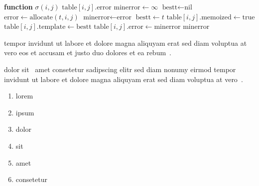 \begin{algorithm}[htb]
\begin{center}
    \begin{algorithmic}[1]
        \STATE \textbf{function} $\sigma\left(i,j\right)$
        \STATE {}
            \RETURN $\text{table}\left[i,j\right].\text{error}$
        \ENDIF
        \STATE $\text{minerror}\leftarrow\infty$
        \STATE $\text{bestt}\leftarrow{}\text{nil}$
            \STATE $\text{error}\leftarrow{}\text{allocate}\left(t,i,j\right)$
                \STATE $\text{minerror}\leftarrow{}\text{error}$
                \STATE $\text{bestt}\leftarrow{}t$
            \ENDIF
        \ENDFOR
        \STATE $\text{table}\left[i,j\right].\text{memoized}\leftarrow{}\text{true}$
        \STATE $\text{table}\left[i,j\right].\text{template}\leftarrow{}\text{bestt}$
        \STATE $\text{table}\left[i,j\right].\text{error}\leftarrow{}\text{minerror}$
        \RETURN $\text{minerror}$
    \end{algorithmic}
\end{center}
\caption[An algorithm with an optional, shorter caption]%
    {\label{alg:alg1}This is an algorithm with a very long
    caption. However, we replaced it with a shorter version
    in the Outline for legibility reasons}%
\end{algorithm}

tempor invidunt ut labore et dolore magna aliquyam erat sed diam
voluptua at vero eos et accusam et justo duo dolores et ea
rebum~\cite{CORMEMALGORITHMS01}.

dolor sit~\cite{BENTLEYBC07} amet consetetur sadipscing elitr sed
diam nonumy eirmod tempor invidunt ut labore et dolore magna
aliquyam erat sed diam voluptua at vero~\cite{BRIANPL04}.

\begin{enumerate}
   \item lorem
   \item ipsum
   \item dolor
   \item sit
   \item amet
   \item consetetur
\end{enumerate}

